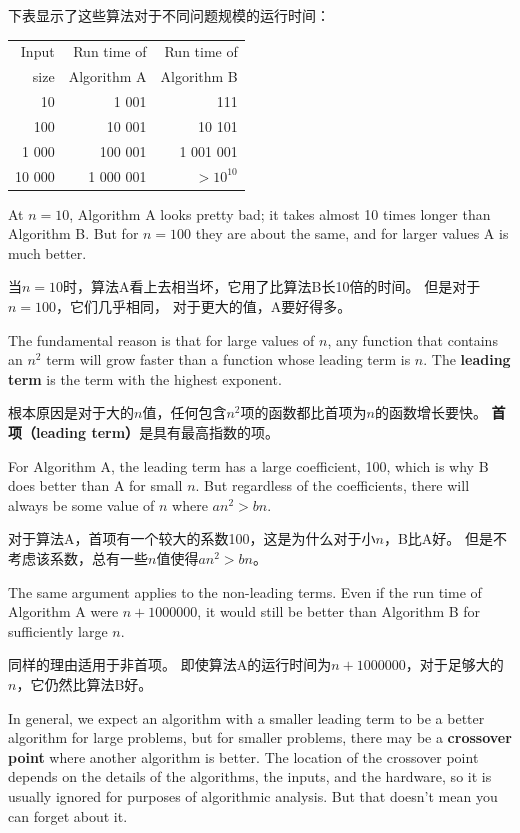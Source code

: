 \documentclass[10pt]{book}
\begin{document}
\begin{CJK}{UTF8}{gbsn}
下表显示了这些算法对于不同问题规模的运行时间：

\begin{tabular}{|r|r|r|}
\hline
Input     &   Run time of     & Run time of \\
size      &   Algorithm A     & Algorithm B \\
\hline
10        &   1 001           & 111         \\
100       &   10 001          & 10 101         \\
1 000     &   100 001         & 1 001 001         \\
10 000    &   1 000 001       & $> 10^{10}$         \\
\hline
\end{tabular}

At $n=10$, Algorithm A looks pretty bad; it takes almost 10 times
longer than Algorithm B.  But for $n=100$ they are about the same, and
for larger values A is much better.

当$n=10$时，算法A看上去相当坏，它用了比算法B长10倍的时间。
但是对于$n=100$，它们几乎相同，
对于更大的值，A要好得多。

The fundamental reason is that for large values of $n$, any function
that contains an $n^2$ term will grow faster than a function whose
leading term is $n$.  The {\bf leading term} is the term with the
highest exponent.

根本原因是对于大的$n$值，任何包含$n^2$项的函数都比首项为$n$的函数增长要快。
{\bf 首项（leading term）}是具有最高指数的项。

For Algorithm A, the leading term has a large coefficient, 100, which
is why B does better than A for small $n$.  But regardless of the
coefficients, there will always be some value of $n$ where
$a n^2 > b n$.

对于算法A，首项有一个较大的系数100，这是为什么对于小$n$，B比A好。
但是不考虑该系数，总有一些$n$值使得$a n^2 > b n$。

The same argument applies to the non-leading terms.  Even if the run
time of Algorithm A were $n+1000000$, it would still be better than
Algorithm B for sufficiently large $n$.

同样的理由适用于非首项。
即使算法A的运行时间为$n+1000000$，对于足够大的$n$，它仍然比算法B好。

In general, we expect an algorithm with a smaller leading term to be a
better algorithm for large problems, but for smaller problems, there
may be a {\bf crossover point} where another algorithm is better.  The
location of the crossover point depends on the details of the
algorithms, the inputs, and the hardware, so it is usually ignored for
purposes of algorithmic analysis.  But that doesn't mean you can forget
about it.


\end{CJK}
\end{document}
